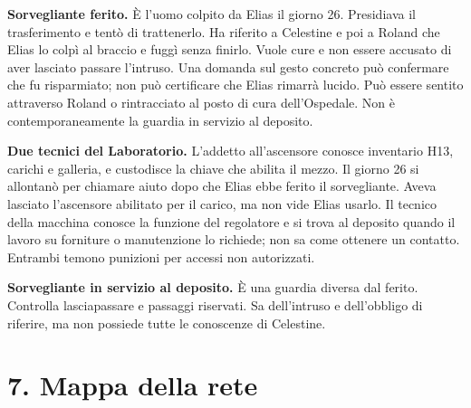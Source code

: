 \documentclass[11pt,a4paper]{article}
\begin{document}
\textbf{Sorvegliante ferito.} È l'uomo colpito da Elias il giorno 26. Presidiava il trasferimento e tentò di trattenerlo. Ha riferito a Celestine e poi a Roland che Elias lo colpì al braccio e fuggì senza finirlo. Vuole cure e non essere accusato di aver lasciato passare l'intruso. Una domanda sul gesto concreto può confermare che fu risparmiato; non può certificare che Elias rimarrà lucido. Può essere sentito attraverso Roland o rintracciato al posto di cura dell'Ospedale. Non è contemporaneamente la guardia in servizio al deposito.

\textbf{Due tecnici del Laboratorio.} L'addetto all'ascensore conosce inventario H13, carichi e galleria, e custodisce la chiave che abilita il mezzo. Il giorno 26 si allontanò per chiamare aiuto dopo che Elias ebbe ferito il sorvegliante. Aveva lasciato l'ascensore abilitato per il carico, ma non vide Elias usarlo. Il tecnico della macchina conosce la funzione del regolatore e si trova al deposito quando il lavoro su forniture o manutenzione lo richiede; non sa come ottenere un contatto. Entrambi temono punizioni per accessi non autorizzati.

\textbf{Sorvegliante in servizio al deposito.} È una guardia diversa dal ferito. Controlla lasciapassare e passaggi riservati. Sa dell'intruso e dell'obbligo di riferire, ma non possiede tutte le conoscenze di Celestine.

\section{7. Mappa della rete}
\end{document}
